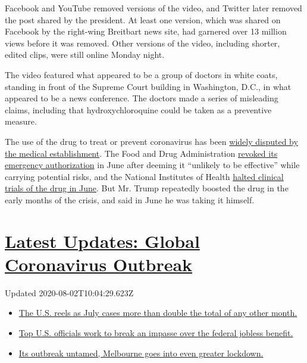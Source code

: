 Facebook and YouTube removed versions of the video, and Twitter later
removed the post shared by the president. At least one version, which
was shared on Facebook by the right-wing Breitbart news site, had
garnered over 13 million views before it was removed. Other versions of
the video, including shorter, edited clips, were still online Monday
night.

The video featured what appeared to be a group of doctors in white
coats, standing in front of the Supreme Court building in Washington,
D.C., in what appeared to be a news conference. The doctors made a
series of misleading claims, including that hydroxychloroquine could be
taken as a preventive measure.

The use of the drug to treat or prevent coronavirus has been
\href{https://www.nytimes.com/article/hydroxychloroquine-coronavirus.html}{widely
disputed by the medical establishment}. The Food and Drug Administration
\href{https://www.fda.gov/media/138945/download}{revoked its emergency
authorization} in June after deeming it ``unlikely to be effective''
while carrying potential risks, and the National Institutes of Health
\href{https://www.nytimes.com/2020/06/20/health/hydroxychloroquine-coronavirus-trial.html}{halted
clinical trials of the drug in June}. But Mr. Trump repeatedly boosted
the drug in the early months of the crisis, and said in June he was
taking it himself.

\hypertarget{latest-updates-global-coronavirus-outbreak}{%
\section{\texorpdfstring{\href{https://www.nytimes.com/2020/08/01/world/coronavirus-covid-19.html?action=click\&pgtype=Article\&state=default\&region=MAIN_CONTENT_1\&context=storylines_live_updates}{Latest
Updates: Global Coronavirus
Outbreak}}{Latest Updates: Global Coronavirus Outbreak}}\label{latest-updates-global-coronavirus-outbreak}}

Updated 2020-08-02T10:04:29.623Z

\begin{itemize}
\tightlist
\item
  \href{https://www.nytimes.com/2020/08/01/world/coronavirus-covid-19.html?action=click\&pgtype=Article\&state=default\&region=MAIN_CONTENT_1\&context=storylines_live_updates\#link-34047410}{The
  U.S. reels as July cases more than double the total of any other
  month.}
\item
  \href{https://www.nytimes.com/2020/08/01/world/coronavirus-covid-19.html?action=click\&pgtype=Article\&state=default\&region=MAIN_CONTENT_1\&context=storylines_live_updates\#link-780ec966}{Top
  U.S. officials work to break an impasse over the federal jobless
  benefit.}
\item
  \href{https://www.nytimes.com/2020/08/01/world/coronavirus-covid-19.html?action=click\&pgtype=Article\&state=default\&region=MAIN_CONTENT_1\&context=storylines_live_updates\#link-2bc8948}{Its
  outbreak untamed, Melbourne goes into even greater lockdown.}
\end{itemize}

